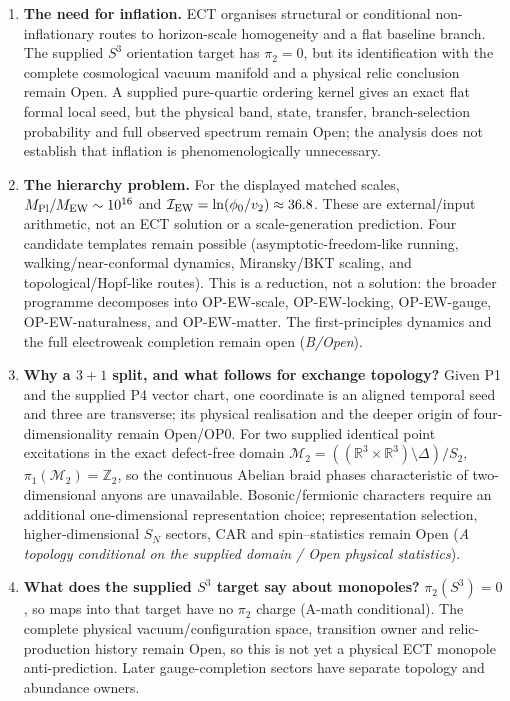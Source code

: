 \documentclass[11pt,a4paper]{article}
\begin{document}
\begin{enumerate}
\item \textbf{The need for inflation.} ECT organises structural or conditional
non-inflationary routes to horizon-scale homogeneity and a flat baseline branch.
The supplied $S^3$ orientation target has $\pi_2=0$, but its identification
with the complete cosmological vacuum manifold and a physical relic conclusion
remain Open. A supplied pure-quartic ordering kernel gives
an exact flat formal local seed, but the physical band, state, transfer,
branch-selection probability and full observed spectrum remain Open; the
analysis does not establish that inflation is phenomenologically unnecessary.

\item \textbf{The hierarchy problem.} For the displayed matched scales,
$M_{\rm Pl}/M_{\rm EW}\sim10^{16}$ and
$\mathcal I_{\rm EW}=\ln(\phi_0/v_2)\approx36.8$.  These are external/input
arithmetic, not an ECT solution or a scale-generation prediction.  Four
candidate templates remain possible (asymptotic-freedom-like running,
walking/near-conformal dynamics, Miransky/BKT scaling, and
topological/Hopf-like routes). This is a reduction, not a solution: the
broader programme decomposes into OP-EW-scale, OP-EW-locking, OP-EW-gauge,
OP-EW-naturalness, and OP-EW-matter. The first-principles dynamics and the
full electroweak completion remain open (\emph{B/Open}).

\item \textbf{Why a $3+1$ split, and what follows for exchange topology?} Given P1 and the supplied P4 vector chart, one coordinate is an aligned temporal seed and three are transverse; its physical realisation and the deeper origin of four-dimensionality remain Open/OP0.  For two supplied identical point excitations in the exact defect-free domain $\mathcal M_2=((\mathbb R^3\times\mathbb R^3)\setminus\Delta)/S_2$, $\pi_1(\mathcal M_2)=\mathbb Z_2$, so the continuous Abelian braid phases characteristic of two-dimensional anyons are unavailable.  Bosonic/fermionic characters require an additional one-dimensional representation choice; representation selection, higher-dimensional $S_N$ sectors, CAR and spin--statistics remain Open (\emph{A topology conditional on the supplied domain / Open physical statistics}).

\item \textbf{What does the supplied $S^3$ target say about monopoles?} $\pi_2(S^3)=0$, so maps into that target have no $\pi_2$ charge (A-math conditional).  The complete physical vacuum/configuration space, transition owner and relic-production history remain Open, so this is not yet a physical ECT monopole anti-prediction.  Later gauge-completion sectors have separate topology and abundance owners.


\end{enumerate}
\end{document}
